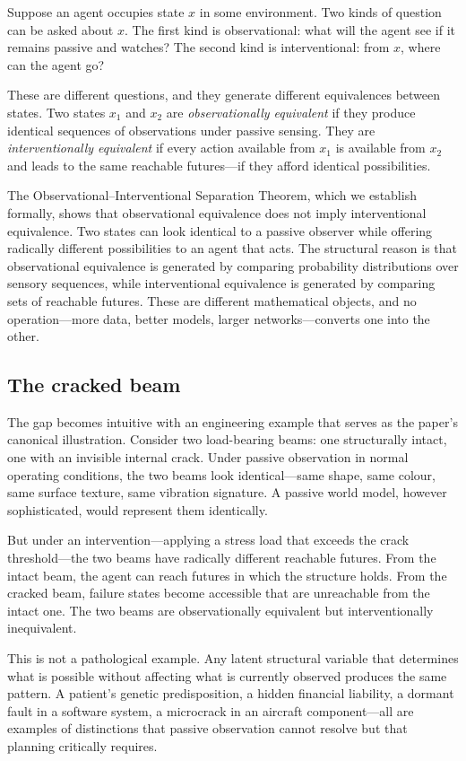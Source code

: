 \documentclass[11pt,a4paper]{article}
\begin{document}
Suppose an agent occupies state $x$ in some environment. Two kinds of question
can be asked about $x$. The first kind is observational: what will the agent
see if it remains passive and watches? The second kind is interventional: from
$x$, where can the agent go?

These are different questions, and they generate different equivalences between
states. Two states $x_1$ and $x_2$ are \emph{observationally equivalent} if
they produce identical sequences of observations under passive sensing. They
are \emph{interventionally equivalent} if every action available from $x_1$
is available from $x_2$ and leads to the same reachable futures---if they afford
identical possibilities.

The Observational--Interventional Separation Theorem, which we establish formally,
shows that observational equivalence does not imply interventional equivalence.
Two states can look identical to a passive observer while offering radically
different possibilities to an agent that acts. The structural reason is that
observational equivalence is generated by comparing probability distributions
over sensory sequences, while interventional equivalence is generated by comparing
sets of reachable futures. These are different mathematical objects, and no
operation---more data, better models, larger networks---converts one into the other.

\subsection{The cracked beam}

The gap becomes intuitive with an engineering example that serves as the paper's
canonical illustration. Consider two load-bearing beams: one structurally intact,
one with an invisible internal crack. Under passive observation in normal
operating conditions, the two beams look identical---same shape, same colour,
same surface texture, same vibration signature. A passive world model, however
sophisticated, would represent them identically.

But under an intervention---applying a stress load that exceeds the crack
threshold---the two beams have radically different reachable futures. From the
intact beam, the agent can reach futures in which the structure holds. From the
cracked beam, failure states become accessible that are unreachable from the
intact one. The two beams are observationally equivalent but interventionally
inequivalent.

This is not a pathological example. Any latent structural variable that
determines what is possible without affecting what is currently observed
produces the same pattern. A patient's genetic predisposition, a hidden
financial liability, a dormant fault in a software system, a microcrack in an
aircraft component---all are examples of distinctions that passive observation
cannot resolve but that planning critically requires.
\end{document}
